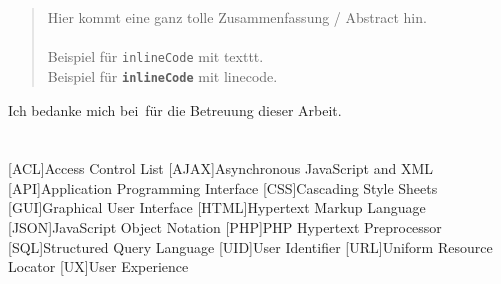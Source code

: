 \documentclass[
  11pt, %
  oneside, %
  ngerman, %
  singlespacing, %
  liststotoc, %
  headsepline, %
  chapterinoneline, %
]{MastersDoctoralThesis} %
\newcommand{\linecode}[1]{
  \textbf{\texttt{#1}}
}
\begin{document}
\begin{abstract}
 \addchaptertocentry{\abstractname} %
 Hier kommt eine ganz tolle Zusammenfassung / Abstract hin.\\
 \\
 \noindent Beispiel für \texttt{inlineCode} mit texttt.\\
 \noindent Beispiel für \linecode{inlineCode} mit linecode.
\end{abstract}



\begin{acknowledgements}
 \addchaptertocentry{\acknowledgementname} %
 Ich bedanke mich bei \supname \,für die Betreuung dieser Arbeit.\\
\end{acknowledgements}


{\hypersetup{linkcolor=black} %
  \tableofcontents %

  \listoffigures %

  \listoftables %

  \lstlistoflistings %
}


  
\chapter{\abbrevname}
\begin{acronym}[AAAAAA]
  [ACL]{Access Control List}
  [AJAX]{Asynchronous JavaScript and XML}
  [API]{Application Programming Interface}
  [CSS]{Cascading Style Sheets}
  [GUI]{Graphical User Interface}
  [HTML]{Hypertext Markup Language}
  [JSON]{JavaScript Object Notation}
  [PHP]{PHP Hypertext Preprocessor}
  [SQL]{Structured Query Language}
  [UID]{User Identifier}
  [URL]{Uniform Resource Locator}
  [UX]{User Experience}
\end{acronym}
\end{document}
